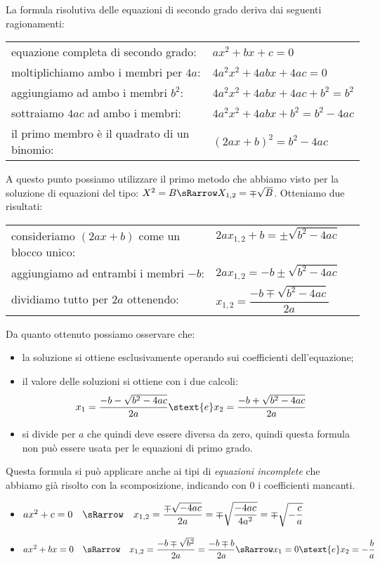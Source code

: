 La formula risolutiva delle equazioni di secondo grado deriva dai seguenti 
ragionamenti:
\begin{center}
\begin{tabular}{ll}
equazione completa di secondo grado: & \(ax^2 +b x +c=0\)\\
moltiplichiamo ambo i membri per \(4a\): & \(4a^2 x^2 +4 a b x +4 a c=0\)\\
aggiungiamo ad ambo i membri \(b^2\): & \(4a^2x^2 +4abx +4ac +b^2=b^2\)\\
sottraiamo \(4ac\) ad ambo i membri: & \(4a^2x^2 +4abx +b^2=b^2 -4ac\)\\
il primo membro è il quadrato di un binomio:~~ & \((2ax +b)^2=b^2 -4ac\)
\end{tabular}
\end{center}
A questo punto possiamo utilizzare il primo metodo che abbiamo visto per la 
soluzione di equazioni del tipo: 
\quad \(X^2=B \sRarrow X_{1,2}=\mp \sqrt{B}\). Otteniamo due risultati:
\begin{center}
\begin{tabular}{ll}
consideriamo \((2ax +b)\) come un blocco unico:~~ & 
    \(2ax_{1,2}+b=\pm \sqrt{b^2 -4ac}\) \quad ~~~\\
aggiungiamo ad entrambi i membri \(-b\): & 
    \(2ax_{1,2}=-b \pm \sqrt{b^2 -4ac}\)\\
dividiamo tutto per \(2a\) ottenendo: & 
    \(x_{1,2} = \dfrac{-b \mp \sqrt{b^2 -4ac}}{2a}\)
\end{tabular}
\end{center}

Da quanto ottenuto possiamo osservare che:
\begin{itemize} [noitemsep]
\item la soluzione si ottiene esclusivamente operando sui coefficienti
dell'equazione;
\item il valore delle soluzioni si ottiene con i due calcoli: 
\[x_1 = \dfrac{-b -\sqrt{b^{2} -4 ac}}{2 a} \stext{e} 
  x_2 = \dfrac{-b +\sqrt{b^{2} -4 ac}}{2 a}\]
\item si divide per \(a\) che quindi deve essere diversa da zero,
quindi questa formula non può essere usata per le equazioni di primo grado.
\end{itemize}

Questa formula si può applicare anche ai tipi di \emph{equazioni incomplete} 
che abbiamo già risolto con la scomposizione, indicando con \(0\) i 
coefficienti mancanti. 

\begin{itemize}
\item \(ax^2 +c=0 \quad \sRarrow \quad 
x_{1,2} = \dfrac{\mp \sqrt{-4ac}}{2a} = 
          \mp \sqrt{\dfrac{-4ac}{4a^2}} = \mp \sqrt{-\dfrac{c}{a}}\)
\item \(ax^2 +b x = 0 \quad \sRarrow \quad 
x_{1,2} = \dfrac{-b \mp \sqrt{b^2}}{2a} = 
          \dfrac{-b \mp b}{2a} \sRarrow 
x_1 = 0 \stext{e} x_2 = -\dfrac{b}{a}\) 
\end{itemize}

